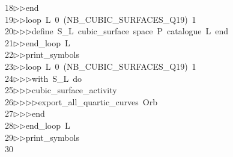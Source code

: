 \begin{tabbing}
18\>$\triangleright$\>$\triangleright$\>end\ \\[0pt]
19\>$\triangleright$\>$\triangleright$\>loop\ L\ 0\ (NB\_CUBIC\_SURFACES\_Q19)\ 1\ \\[0pt]
20\>$\triangleright$\>$\triangleright$\>$\triangleright$\>define\ S\_L\ cubic\_surface\ space\ P\ catalogue\ L\ end\ \\[0pt]
21\>$\triangleright$\>$\triangleright$\>end\_loop\ L\ \\[0pt]
22\>$\triangleright$\>$\triangleright$\>print\_symbols\ \\[0pt]
23\>$\triangleright$\>$\triangleright$\>loop\ L\ 0\ (NB\_CUBIC\_SURFACES\_Q19)\ 1\ \\[0pt]
24\>$\triangleright$\>$\triangleright$\>$\triangleright$\>with\ S\_L\ do\ \\[0pt]
25\>$\triangleright$\>$\triangleright$\>$\triangleright$\>cubic\_surface\_activity\ \\[0pt]
26\>$\triangleright$\>$\triangleright$\>$\triangleright$\>$\triangleright$\>export\_all\_quartic\_curves\ Orb\ \\[0pt]
27\>$\triangleright$\>$\triangleright$\>$\triangleright$\>end\ \\[0pt]
28\>$\triangleright$\>$\triangleright$\>end\_loop\ L\ \\[0pt]
29\>$\triangleright$\>$\triangleright$\>print\_symbols\\[0pt]
30\>\end{tabbing}
